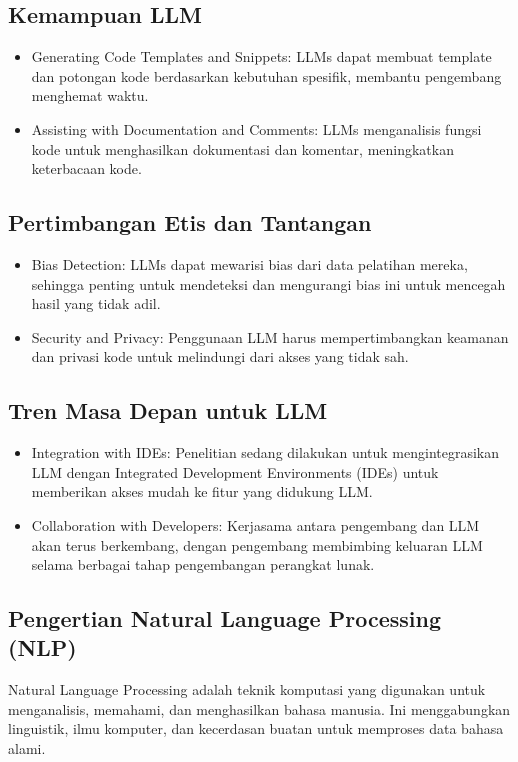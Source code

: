 \documentclass{article}
\begin{document}
\subsection{Kemampuan LLM}
\begin{itemize}
    \item Generating Code Templates and Snippets: LLMs dapat membuat template dan potongan kode berdasarkan kebutuhan spesifik, membantu pengembang menghemat waktu.
    \item Assisting with Documentation and Comments: LLMs menganalisis fungsi kode untuk menghasilkan dokumentasi dan komentar, meningkatkan keterbacaan kode.
\end{itemize}

\subsection{Pertimbangan Etis dan Tantangan}
\begin{itemize}
    \item Bias Detection: LLMs dapat mewarisi bias dari data pelatihan mereka, sehingga penting untuk mendeteksi dan mengurangi bias ini untuk mencegah hasil yang tidak adil.
    \item Security and Privacy: Penggunaan LLM harus mempertimbangkan keamanan dan privasi kode untuk melindungi dari akses yang tidak sah.
\end{itemize}

\subsection{Tren Masa Depan untuk LLM}
\begin{itemize}
    \item Integration with IDEs: Penelitian sedang dilakukan untuk mengintegrasikan LLM dengan Integrated Development Environments (IDEs) untuk memberikan akses mudah ke fitur yang didukung LLM.
    \item Collaboration with Developers: Kerjasama antara pengembang dan LLM akan terus berkembang, dengan pengembang membimbing keluaran LLM selama berbagai tahap pengembangan perangkat lunak.
\end{itemize}

\subsection{Pengertian Natural Language Processing (NLP)}
Natural Language Processing adalah teknik komputasi yang digunakan untuk menganalisis, memahami, dan menghasilkan bahasa manusia. Ini menggabungkan linguistik, ilmu komputer, dan kecerdasan buatan untuk memproses data bahasa alami.
\end{document}
